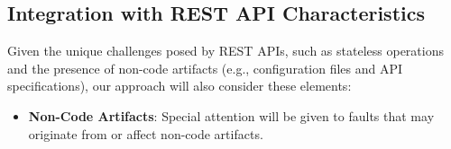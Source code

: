 \documentclass[conference]{IEEEtran}
\begin{document}


\subsection{Integration with REST API Characteristics}
Given the unique challenges posed by REST APIs, such as stateless operations and the presence of non-code artifacts (e.g., configuration files and API specifications), our approach will also consider these elements:
\begin{itemize}
    \item \textbf{Non-Code Artifacts}: Special attention will be given to faults that may originate from or affect non-code artifacts. 
\end{itemize}
\end{document}
